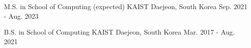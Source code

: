 

\begin{cventries}

  \cventry
    {M.S. in School of Computing (expected)} %
    {KAIST} %
    {Daejeon, South Korea} %
    {Sep. 2021 - Aug. 2023} %
    {
    }

  \cventry
    {B.S. in School of Computing} %
    {KAIST} %
    {Daejeon, South Korea} %
    {Mar. 2017 - Aug. 2021} %
    {
    }
\end{cventries}
